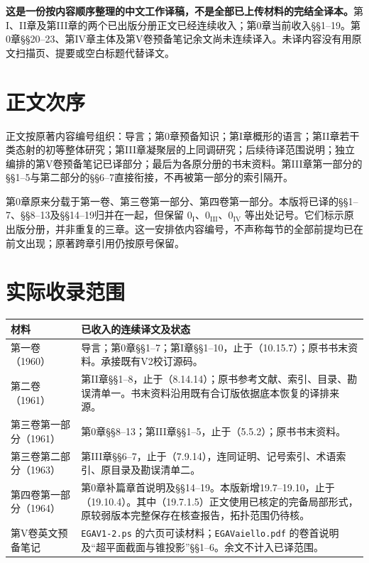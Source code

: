\maketitle
{}
\noindent\textbf{这是一份按内容顺序整理的中文工作译稿，不是全部已上传材料的完结全译本。}第I、II章及第III章的两个已出版分册正文已经连续收入；第0章当前收入§§1--19。第0章§§20--23、第IV章主体及第V卷预备笔记余文尚未连续译入。未译内容没有用原文扫描页、提要或空白标题代替译文。

\section*{正文次序}
正文按原著内容编号组织：导言；第0章预备知识；第I章概形的语言；第II章若干类态射的初等整体研究；第III章凝聚层的上同调研究；后续待译范围说明；独立编排的第V卷预备笔记已译部分；最后为各原分册的书末资料。第III章第一部分的§§1--5与第二部分的§§6--7直接衔接，不再被第一部分的索引隔开。

第0章原来分载于第一卷、第三卷第一部分、第四卷第一部分。本版将已译的§§1--7、§§8--13及§§14--19归并在一起，但保留 $0_{\mathrm I}$、$0_{\mathrm{III}}$、$0_{\mathrm{IV}}$ 等出处记号。它们标示原出版分册，并非重复的三章。这一安排依内容编号，不声称每节的全部前提均已在前文出现；原著跨章引用仍按原号保留。

\section*{实际收录范围}
\begin{longtable}{@{}p{.25\linewidth}p{.67\linewidth}@{}}
\toprule 材料 & 已收入的连续译文及状态\\\midrule\endhead
第一卷（1960） & 导言；第0章§§1--7；第I章§§1--10，止于（10.15.7）；原书书末资料。承接既有V2校订源码。\\
第二卷（1961） & 第II章§§1--8，止于（8.14.14）；原书参考文献、索引、目录、勘误清单一。书末资料沿用既有合订版依据底本恢复的译排来源。\\
第三卷第一部分（1961） & 第0章§§8--13；第III章§§1--5，止于（5.5.2）；原书书末资料。\\
第三卷第二部分（1963） & 第III章§§6--7，止于（7.9.14），连同证明、记号索引、术语索引、原目录及勘误清单二。\\
第四卷第一部分（1964） & 第0章补篇章首说明及§§14--19。本版新增19.7--19.10，止于（19.10.4）。其中（19.7.1.5）正文使用已核定的完备局部形式，原较弱版本完整保存在核查报告，拓扑范围仍待核。\\
第V卷英文预备笔记 & \texttt{EGAV1-2.ps} 的六页可读材料；\texttt{EGAVaiello.pdf} 的卷首说明及“超平面截面与锥投影”§§1--6。余文不计入已译范围。\\
\bottomrule
\end{longtable}


